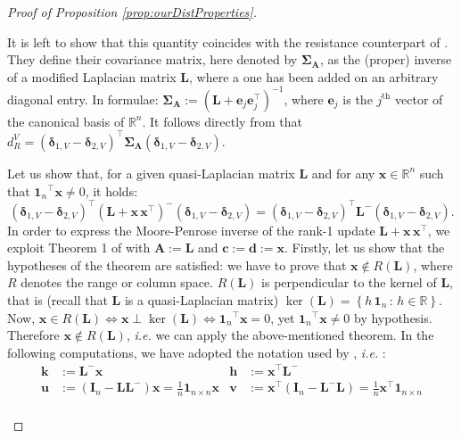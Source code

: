 \documentclass[12pt]{article}
\theoremstyle{plain}
\theoremstyle{remark}
\newcommand{\round}[1]{\left( #1 \right)}
\newcommand{\curly}[1]{\left\{ #1 \right\}}
\newcommand{\R}[0]{\mathbb{R}}
\newcommand{\onen}[0]{{\mathbf{1}_{n}}}
\newcommand{\onenn}[0]{{\mathbf{1}_{n\times n}}}
\newcommand{\ie}{\textit{i.e. }}
\newcommand{\dVec}[1]{{\bm{#1}}}            %
\newcommand{\latMatr}[1]{\mathbf{#1}}          %
\newcommand{\grMatr}[1]{{\boldsymbol{#1}}}   %
\begin{document}
\begin{proof}[Proof of Proposition \ref{prop:ourDistProperties}]
\begin{enumerate}
            It is left to show that this quantity coincides with the resistance counterpart of \cite{anderes_isotropic_2020}. They define their covariance matrix, here denoted by ${\grMatr{\Sigma}}_{\latMatr{A}}$, as the (proper) inverse of a modified Laplacian matrix $\latMatr{L}$, where a one has been added on an arbitrary diagonal entry. In formulae: ${\grMatr{\Sigma}}_{\latMatr{A}}:=({\latMatr{L}}+\dVec e_j \dVec e_j^\top)^{-1}$, where $\dVec e_j$ is the $j^\text{th}$ vector of the canonical basis of $\R^n$. It follows directly from \citet[Equation 13]{anderes_isotropic_2020} that $d_{R}^V=\round{\dVec{\delta}_{1,V}-\dVec{\delta}_{2,V}}^\top {\grMatr{\Sigma}}_{\latMatr{A}} \round{\dVec{\delta}_{1,V}-\dVec{\delta}_{2,V}}$.\par
            Let us show that, for a given quasi-Laplacian matrix $\latMatr{L}$ and for any $\dVec x \in \R^n$ such that $\onen^\top \dVec x \ne 0$, it holds:
            \begin{equation}
                \label{eq:thesisRank1Update}
                \round{\dVec{\delta}_{1,V}-\dVec{\delta}_{2,V}}^\top \round{{\latMatr{L}}+\dVec x\,\dVec x^\top}^- \round{\dVec{\delta}_{1,V}-\dVec{\delta}_{2,V}} = \round{\dVec{\delta}_{1,V}-\dVec{\delta}_{2,V}}^\top {\latMatr{L}}^- \round{\dVec{\delta}_{1,V}-\dVec{\delta}_{2,V}}.
            \end{equation}
             In order to express the Moore-Penrose inverse of the rank-1 update ${\latMatr{L}}+\dVec x\,\dVec x^\top$, we exploit Theorem 1 of \cite{meyer_generalized_1973} with ${\latMatr{A}}:=\latMatr L$ and $\dVec c:=\dVec d:=\dVec x$. Firstly, let us show that the hypotheses of the theorem are satisfied: we have to prove that $\dVec x\not\in R({\latMatr{L}})$, where $R$ denotes the range or column space. $R({\latMatr{L}})$ is perpendicular to the kernel of $\latMatr L$, that is (recall that $\latMatr L$ is a quasi-Laplacian matrix) $\ker({\latMatr{L}})=\curly{h\,\onen\,:\,h\in\R}$. Now, $\dVec x\in R({\latMatr{L}})\iff \dVec x \perp \ker({\latMatr{L}}) \iff \onen^\top \dVec x=0$, yet $\onen^\top \dVec x \ne 0$ by hypothesis. Therefore $\dVec x\not\in R({\latMatr{L}})$, \ie we can apply the above-mentioned theorem. In the following computations, we have adopted the notation used by \citet[Section 2]{meyer_generalized_1973}, \ie:
             \begin{align*}
                 \dVec k&:={\latMatr{L}}^-\dVec x & \dVec h&:=\dVec x^\top {\latMatr{L}}^-\\
                 \dVec u&:=\round{\latMatr{I}_n-\latMatr L{\latMatr{L}}^-}\dVec x=\frac{1}{n} \onenn \dVec x & \dVec v&:= \dVec x^\top \round{\latMatr{I}_n-{\latMatr{L}}^- \latMatr L} = \frac{1}{n} \dVec x^\top \onenn\\

\end{align*}
\end{enumerate}
\end{proof}
\end{document}
